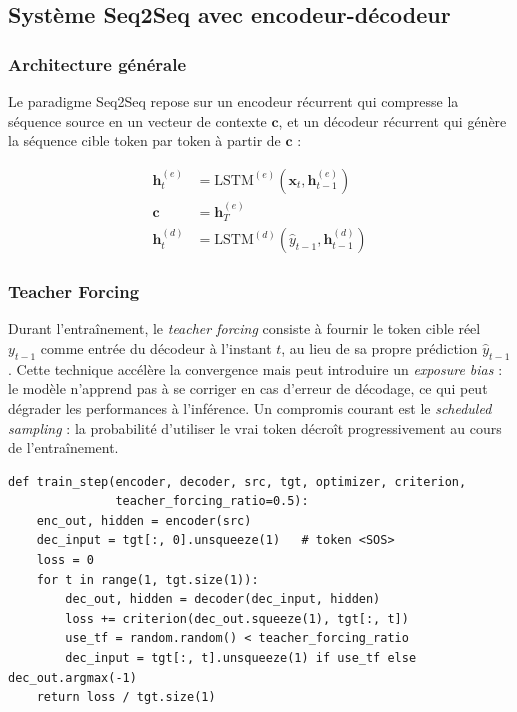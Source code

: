 \documentclass[11pt,a4paper]{article}
\begin{document}
\subsection{Système Seq2Seq avec encodeur-décodeur}

\subsubsection{Architecture générale}

Le paradigme Seq2Seq \cite{sutskever2014sequence} repose sur un encodeur récurrent
qui compresse la séquence source en un vecteur de contexte $\mathbf{c}$, et un décodeur
récurrent qui génère la séquence cible token par token à partir de $\mathbf{c}$ :

\begin{align}
  \mathbf{h}_t^{(e)} &= \mathrm{LSTM}^{(e)}(\mathbf{x}_t, \mathbf{h}_{t-1}^{(e)}) \\
  \mathbf{c} &= \mathbf{h}_T^{(e)} \\
  \mathbf{h}_t^{(d)} &= \mathrm{LSTM}^{(d)}(\hat{y}_{t-1}, \mathbf{h}_{t-1}^{(d)})
\end{align}

\subsubsection{Teacher Forcing}

Durant l'entraînement, le \textit{teacher forcing} consiste à fournir le token cible
réel $y_{t-1}$ comme entrée du décodeur à l'instant $t$, au lieu de sa propre prédiction
$\hat{y}_{t-1}$. Cette technique accélère la convergence mais peut introduire un
\textit{exposure bias} : le modèle n'apprend pas à se corriger en cas d'erreur de
décodage, ce qui peut dégrader les performances à l'inférence. Un compromis courant
est le \textit{scheduled sampling} : la probabilité d'utiliser le vrai token décroît
progressivement au cours de l'entraînement.

\begin{lstlisting}[caption={Boucle d'entraînement Seq2Seq avec teacher forcing.},
                   label={lst:seq2seq_tf}]
def train_step(encoder, decoder, src, tgt, optimizer, criterion,
               teacher_forcing_ratio=0.5):
    enc_out, hidden = encoder(src)
    dec_input = tgt[:, 0].unsqueeze(1)   # token <SOS>
    loss = 0
    for t in range(1, tgt.size(1)):
        dec_out, hidden = decoder(dec_input, hidden)
        loss += criterion(dec_out.squeeze(1), tgt[:, t])
        use_tf = random.random() < teacher_forcing_ratio
        dec_input = tgt[:, t].unsqueeze(1) if use_tf else dec_out.argmax(-1)
    return loss / tgt.size(1)
\end{lstlisting}
\end{document}
